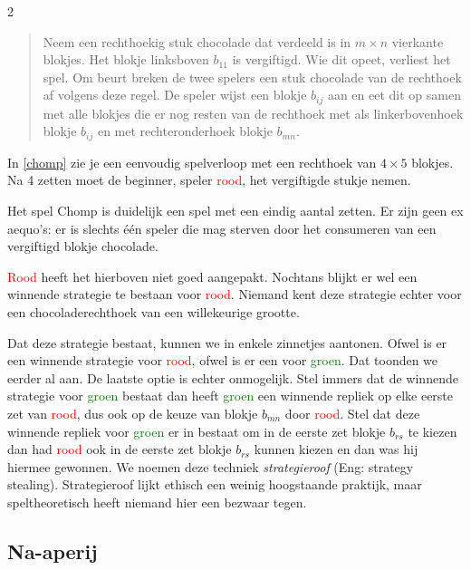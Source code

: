 \begin{multicols}{2}
\begin{quote}
Neem een rechthoekig stuk chocolade dat verdeeld is in $m\times n$ vierkante blokjes. Het blokje linksboven $b_{11}$ is vergiftigd. Wie dit opeet, verliest het spel. Om beurt breken de twee spelers een stuk chocolade van de rechthoek af volgens deze  regel. De speler wijst een blokje $b_{ij}$ aan en eet dit op samen met alle blokjes die er nog resten van de rechthoek met als linkerbovenhoek blokje $b_{ij}$ en met rechteronderhoek blokje  $b_{mn}$.
\end{quote}

In \autoref{chomp} zie je een eenvoudig spelverloop met een rechthoek van $4\times 5$ blokjes. Na  4 zetten moet de beginner, speler \textcolor{red}{rood}, het vergiftigde stukje nemen.


Het spel Chomp is duidelijk een spel met een eindig aantal zetten. Er zijn geen ex aequo's: er is slechts één speler die mag sterven door het consumeren van een vergiftigd blokje chocolade. 

\textcolor{red}{Rood} heeft het hierboven niet goed aangepakt. Nochtans blijkt er wel een winnende strategie te bestaan voor \textcolor{red}{rood}. Niemand kent deze strategie echter voor een chocoladerechthoek van een willekeurige grootte. 

Dat deze strategie bestaat, kunnen we in enkele zinnetjes aantonen. Ofwel is er een winnende strategie voor \textcolor{red}{rood}, ofwel is er een voor \textcolor{green}{groen}. Dat toonden we eerder al aan. De laatste optie is echter onmogelijk. Stel immers dat de winnende strategie voor \textcolor{green}{groen} bestaat dan heeft \textcolor{green}{groen} een winnende repliek op elke eerste zet van \textcolor{red}{rood}, dus ook op de keuze van blokje $b_{mn}$ door \textcolor{red}{rood}. Stel dat deze winnende repliek voor \textcolor{green}{groen} er in bestaat om in de eerste zet blokje $b_{rs}$ te kiezen dan had \textcolor{red}{rood} ook in de eerste zet blokje $b_{rs}$ kunnen kiezen en dan was hij hiermee gewonnen. We noemen deze techniek \emph{strategieroof} (Eng: strategy stealing). Strategieroof lijkt ethisch een weinig hoogstaande praktijk, maar speltheoretisch heeft niemand hier een bezwaar tegen.

\subsection*{Na-aperij}


\end{multicols}
